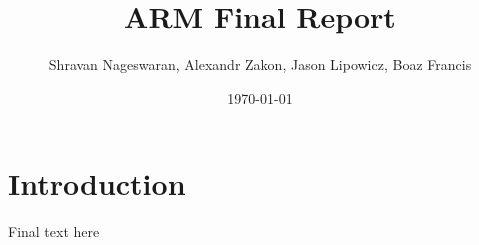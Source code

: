 \documentclass[11pt]{article}
\begin{document}
\title{\textbf{ARM Final Report}}
\author{Shravan Nageswaran, Alexandr Zakon, Jason Lipowicz, Boaz Francis}
\date{\today}

\maketitle

\vspace{0.2in}

\section{Introduction}

Final text here
\end{document}
